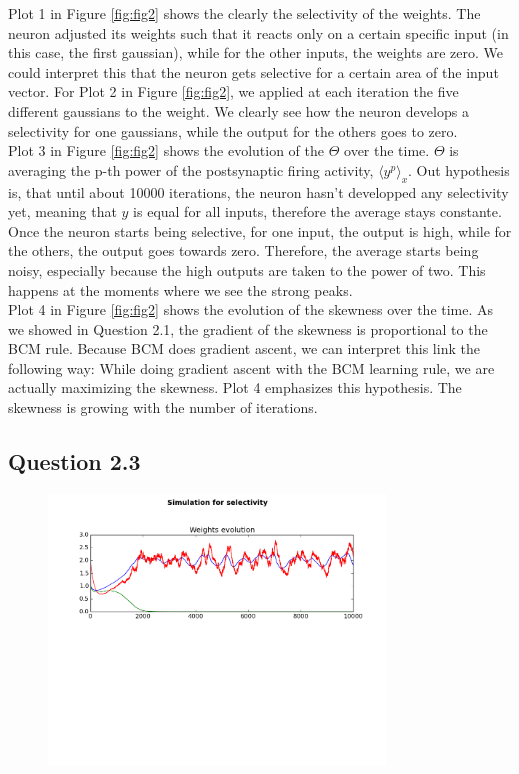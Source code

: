 Plot 1 in Figure \ref{fig:fig2} shows the clearly the selectivity of the weights. The neuron adjusted its weights such that it reacts only on a certain specific input (in this case, the first gaussian), while for the other inputs, the weights are zero. We could interpret this that the neuron gets selective for a certain area of the input vector. \newline
For Plot 2 in Figure \ref{fig:fig2}, we applied at each iteration the five different gaussians to the weight. We clearly see how the neuron develops a selectivity for one gaussians, while the output for the others goes to zero. \\
Plot 3 in Figure \ref{fig:fig2} shows the evolution of the $\Theta$ over the time. $\Theta$ is averaging the p-th power of the postsynaptic firing activity, $\langle y^p \rangle_x$. Out hypothesis is, that until about 10000 iterations, the neuron hasn't developped any selectivity yet, meaning that $y$ is equal for all inputs, therefore the average stays constante. Once the neuron starts being selective, for one input, the output is high, while for the others, the output goes towards zero. Therefore, the average starts being noisy, especially because the high outputs are taken to the power of two. This happens at the moments where we see the strong peaks. \\
Plot 4 in Figure \ref{fig:fig2} shows the evolution of the skewness over the time. As we showed in Question 2.1, the gradient of the skewness is proportional to the BCM rule. Because BCM does gradient ascent, we can interpret this link the following way: While doing gradient ascent with the BCM learning rule, we are actually maximizing the skewness. Plot 4 emphasizes this hypothesis. The skewness is growing with the number of iterations.

\subsection{Question 2.3}

\begin{figure}[H]
 \centering
 \includegraphics[width = 0.8\textwidth]{../results/exercise23}
 \caption{}
 \label{fig:bild3}
\end{figure}

